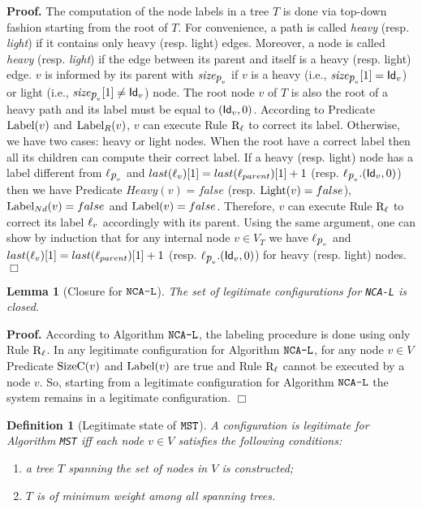 \documentclass[11pt,a4paper]{article}
\newtheorem{definition}{Definition}
\newtheorem{lemma}{Lemma}
\newenvironment{proof}{\noindent \begin{rm}{\textbf{Proof.} }}{\hspace*{\fill}$\Box$\par\end{rm}}
\newcommand{\id}{\mbox{\sf Id}}
\newcommand{\parent}{\mbox{\it p}}
\newcommand{\lab}{\mbox{\rm $\ell$}}
\newcommand{\TS}{\mbox{\it size}}
\newcommand{\SizeC}{\mbox{\rm SizeC}}
\newcommand{\LabelR}{\mbox{\rm Label$_R$}}
\newcommand{\LabelNd}{\mbox{\rm Label$_{Nd}$}}
\newcommand{\Label}{\mbox{\rm Label}}
\newcommand{\Light}{\mbox{\rm Light}}
\newcommand{\MST}{\mbox{\tt MST}}
\newcommand{\LabA}{\mbox{\tt NCA-L}}
\begin{document}
\begin{proof}
The computation of the node labels in a tree $T$ is done via top-down fashion starting from the root of $T$. For convenience, a path is called \emph{heavy} (resp. \emph{light}) if it contains only heavy (resp. light) edges. Moreover, a node is called \emph{heavy} (resp. \emph{light}) if the edge between its parent and itself is a heavy (resp. light) edge. $v$ is informed by its parent with $\TS_{\parent_v}$ if $v$ is a heavy (i.e., $\TS_{\parent_v}[1]=\id_v$) or light (i.e., $\TS_{\parent_v}[1] \neq \id_v$) node. The root node $v$ of $T$ is also the root of a heavy path and its label must be equal to $(\id_v,0)$. According to Predicate $\Label(v)$ and $\LabelR(v)$, $v$ can execute Rule $\mbox{\rm R$_{\ell}$}$ to correct its label. Otherwise, we have two cases: heavy or light nodes. When the root have a correct label then all its children can compute their correct label. If a heavy (resp. light) node has a label different from $\lab_{\parent_v}$ and $last(\lab_v)[1]=last(\lab_{parent})[1]+1$ (resp. $\lab_{\parent_v}.(\id_v,0)$) then we have Predicate $Heavy(v)=false$ (resp. $\Light(v)=false$), $\LabelNd(v)=false$ and $\Label(v)=false$. Therefore, $v$ can execute Rule $\mbox{\rm R$_{\ell}$}$ to correct its label $\lab_v$ accordingly with its parent. Using the same argument, one can show by induction that for any internal node $v \in V_T$ we have $\lab_{\parent_v}$ and $last(\lab_v)[1]=last(\lab_{parent})[1]+1$ (resp. $\lab_{\parent_v}.(\id_v,0)$) for heavy (resp. light) nodes.
\end{proof}

\begin{lemma}[Closure for $\LabA$]
\label{lem:label_closure}
The set of legitimate configurations for \LabA\/ is closed.
\end{lemma}

\begin{proof}
According to Algorithm $\LabA$, the labeling procedure is done using only Rule $\mbox{\rm R$_{\ell}$}$. In any legitimate configuration for Algorithm $\LabA$, for any node $v \in V$ Predicate $\SizeC(v)$ and $\Label(v)$ are true and Rule $\mbox{\rm R$_{\ell}$}$ cannot be executed by a node $v$. So, starting from a legitimate configuration for Algorithm $\LabA$ the system remains in a legitimate configuration.
\end{proof}

\begin{definition}[Legitimate state of $\MST$]
\label{def:mst_legitimate_configuration}
A configuration is legitimate for Algorithm \MST\/ iff each node $v \in V$ satisfies the following conditions:
\begin{enumerate}
\item a tree $T$ spanning the set of nodes in $V$ is constructed;
\item $T$ is of minimum weight among all spanning trees.
\end{enumerate}
\end{definition}
\end{document}
